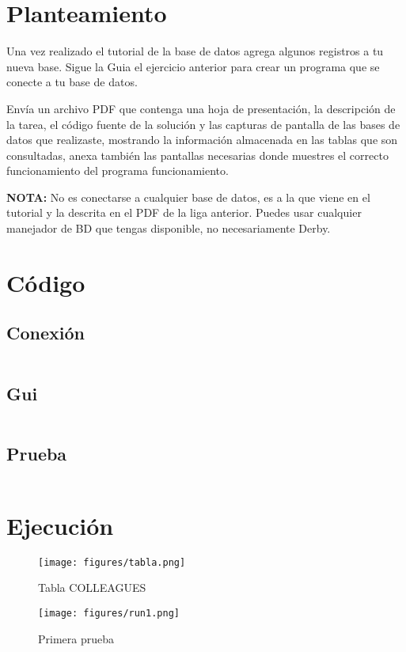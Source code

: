 \documentclass[12pt]{article}
\author{Pablo Vargas Bermúdez}
\begin{document}
\pagestyle{empty}


\section*{Planteamiento}
Una vez realizado el tutorial de la base de datos agrega algunos
registros a tu nueva base.  Sigue la Guia el ejercicio anterior para
crear un programa que se conecte a tu base de datos.

Envía un archivo PDF que contenga una hoja de presentación, la
descripción de la tarea, el código fuente de la solución y las
capturas de pantalla de las bases de datos que realizaste, mostrando
la información almacenada en las tablas que son consultadas, anexa
también las pantallas necesarias donde muestres el correcto
funcionamiento del programa funcionamiento.

\textbf{NOTA:} No es conectarse a cualquier base de datos, es a la que viene en
el tutorial y la descrita en el PDF de la liga anterior. Puedes usar
cualquier manejador de BD que tengas disponible, no necesariamente
Derby.

\section*{Código}

\subsection*{Conexión}
\inputminted{Java}{DataBase.java}
\subsection*{Gui}
\inputminted{Java}{Gui.java}
\subsection*{Prueba}
\inputminted{Java}{PruebaDataBase.java}

\section*{Ejecución}
\begin{figure}[ht]
  \centering
  \texttt{[image: figures/tabla.png]}
  \caption{Tabla COLLEAGUES}
\end{figure}

\begin{figure}[ht]
  \centering
  \texttt{[image: figures/run1.png]}
  \caption{Primera prueba}
\end{figure}
\end{document}
